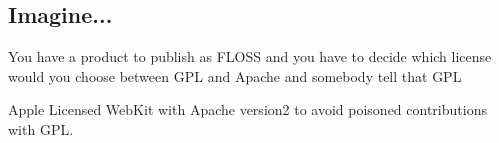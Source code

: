 \documentclass[11pt]{scrartcl}
\begin{document}
\subsection{Imagine...}

You have a product to publish as FLOSS and you have to decide which license would you choose between GPL and Apache and somebody tell that GPL 

Apple Licensed WebKit with Apache version2 to avoid poisoned contributions with GPL.

\end{document}
